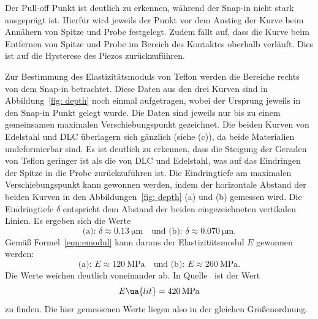 Der Pull-off Punkt ist deutlich zu erkennen, während der Snap-in nicht stark ausgeprägt ist. Hierfür wird
jeweils der Punkt vor dem Anstieg der Kurve beim Annähern von Spitze und Probe festgelegt. Zudem fällt auf, dass
die Kurve beim Entfernen von Spitze und Probe im Bereich des Kontaktes oberhalb verläuft. Dies ist auf die
Hysterese des Piezos zurückzuführen.

Zur Bestimmung des Elastizitätsmoduls von Teflon werden die Bereiche rechts von dem Snap-in betrachtet. Diese Daten aus den drei Kurven sind
in Abbildung~\ref{fig: depth} noch einmal aufgetragen, wobei der Ursprung jeweils in den Snap-in Punkt gelegt wurde. Die Daten sind
jeweils nur bis zu einem gemeinsamen maximalen Verschiebungspunkt gezeichnet.
Die beiden Kurven von Edelstahl und DLC überlagern sich gänzlich (siehe (c)), da beide Materialien undeformierbar sind.
Es ist deutlich zu erkennen, dass
die Steigung der Geraden von Teflon geringer ist als die von DLC und Edelstahl, was auf das Eindringen der Spitze in die Probe zurückzuführen ist.
Die Eindringtiefe am maximalen Verschiebungspunkt kann gewonnen werden, indem der horizontale Abstand der beiden Kurven in den Abbildungen~\ref{fig: depth}
(a) und (b) gemessen wird. Die Eindringtiefe $\delta$ entspricht dem Abstand der beiden eingezeichneten vertikalen Linien.
Es ergeben sich die Werte
\begin{equation}
  \text{(a): } \delta \approx \SI{0.13}{\micro\meter} \quad \text{und (b): }\delta \approx \SI{0.070}{\micro\meter}.
\end{equation}
Gemäß Formel~\eqref{eqn:emodul} kann daraus der Elastizitätsmodul $E$ gewonnen werden:
\begin{equation}
  \text{(a): } E \approx \SI{120}{\mega \pascal} \quad \text{und (b): } E \approx \SI{260}{\mega \pascal}.
\end{equation}
Die Werte weichen deutlich voneinander ab.
In Quelle~\cite{emodulteflon} ist der Wert
\begin{equation}
  E\ua{lit} = \SI{420}{\mega \pascal}
\end{equation}
zu finden. Die hier gemessenen Werte liegen also in der gleichen Größenordnung.

